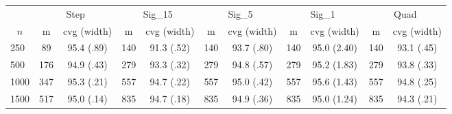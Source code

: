 \begin{tabular}{lcccccccccc}
   \toprule
 
           & \multicolumn{2}{c}{Step}& \multicolumn{2}{c}{Sig\_15}& \multicolumn{2}{c}{Sig\_5}& \multicolumn{2}{c}{Sig\_1}& \multicolumn{2}{c}{Quad} \\ 
             \cmidrule(l{2pt}r{2pt}){2-3} \cmidrule(l{2pt}r{2pt}){4-5} \cmidrule(l{2pt}r{2pt}){6-7} \cmidrule(l{2pt}r{2pt}){8-9}  \cmidrule(l{2pt}r{2pt}){10-11} 
             \multicolumn{1}{c}{$n$} & \multicolumn{1}{c}{m}& \multicolumn{1}{c}{cvg (width)}& \multicolumn{1}{c}{m}& \multicolumn{1}{c}{cvg (width)}& \multicolumn{1}{c}{m}& \multicolumn{1}{c}{cvg (width)}& \multicolumn{1}{c}{m}& \multicolumn{1}{c}{cvg (width)}& \multicolumn{1}{c}{m}& \multicolumn{1}{c}{cvg (width)} \\ \midrule 
        250 & 89 & 95.4 (.89) & 140 & 91.3 (.52) & 140 & 93.7 (.80) & 140 & 95.0 (2.40) & 140 & 93.1 (.45) \\ 
  500 & 176 & 94.9 (.43) & 279 & 93.3 (.32) & 279 & 94.8 (.57) & 279 & 95.2 (1.83) & 279 & 93.8 (.33) \\ 
  1000 & 347 & 95.3 (.21) & 557 & 94.7 (.22) & 557 & 95.0 (.42) & 557 & 95.6 (1.43) & 557 & 94.8 (.25) \\ 
  1500 & 517 & 95.0 (.14) & 835 & 94.7 (.18) & 835 & 94.9 (.36) & 835 & 95.0 (1.24) & 835 & 94.3 (.21) \\ 
   \hline
\end{tabular}
